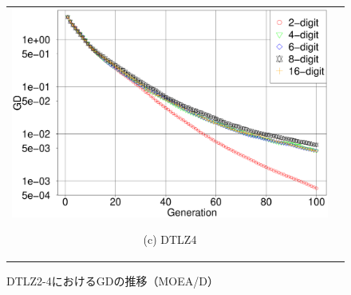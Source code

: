 \documentclass[../main/main]{subfiles}
\begin{document}
\begin{figure}[htbp]
\begin{tabular}{cc}
\begin{minipage}{0.32\hsize}
\includegraphics[width=1\linewidth]{../figures/MOEAD/DTLZ4_GD.eps}
\begin{center}
{\footnotesize (c) DTLZ4}
\end{center}
\end{minipage}
\end{tabular}
\caption{DTLZ2-4におけるGDの推移（MOEA/D）}
\label{fig:gd_dtlz_moead}
\end{figure}
\end{document}
